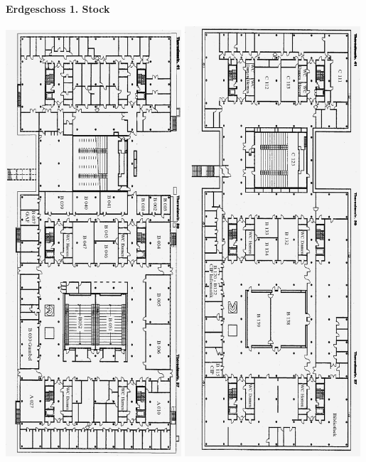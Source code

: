 \documentclass[twoside,12pt,parskip=half-]{scrartcl}
\begin{document}
\begin{center}
\bf Erdgeschoss \hspace{0.5\textwidth} 1. Stock

\includegraphics[width=0.49\textwidth]{theresien1.png}
\includegraphics[width=0.49\textwidth]{theresien2.png}



\end{center}
\end{document}
